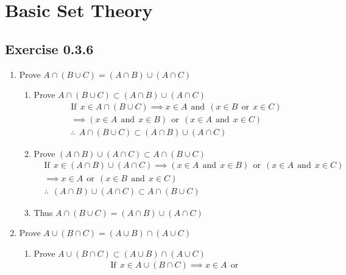 \chapter*{Basic Set Theory}
\section*{Exercise 0.3.6}
  \begin{enumerate}
    \item Prove $A \cap (B \cup C) = (A \cap B) \cup (A \cap C)$
    \begin{enumerate}
      \item Prove $A \cap (B \cup C) \subset (A \cap B) \cup (A \cap C)$
      \begin{align*}
        \nonumber
        &\text{If}\ \ x \in A \cap (B \cup C) \implies x \in A \ \ \text{and}\ \ 
        (x \in B \ \ \text{or} \ \ x \in C) \\
        \nonumber
        &\implies (x \in A \ \ \text{and} \ \ x \in B) \ \ \text{or} \ \ 
        (x \in A \ \ \text{and} \ \ x \in C) \\
        \nonumber
        &\therefore \ \ A \cap (B \cup C) \subset (A \cap B) \cup (A \cap C)
      \end{align*}
      \item Prove $(A \cap B) \cup (A \cap C) \subset A \cap (B \cup C)$
      \begin{align*}
        \nonumber
        &\text{If}\ \ x \in (A \cap B) \cup (A \cap C) \implies
        (x \in A \ \ \text{and} \ \ x \in B)\ \ \text{or} \ \ 
        (x \in A \ \ \text{and} \ \ x \in C) \\
        \nonumber
        &\implies x \in A \ \ \text{or} \ \ 
        (x \in B \ \ \text{and} \ \ x \in C) \\
        \nonumber
        &\therefore \ \ (A \cap B) \cup (A \cap C) \subset A \cap (B \cup C)
      \end{align*}
      \item Thus $A \cap (B \cup C) = (A \cap B) \cup (A \cap C)$ \qedsymbol{}
    \end{enumerate}
    \item Prove $A \cup (B \cap C) = (A \cup B) \cap (A \cup C)$
    \begin{enumerate}
      \item Prove $A \cup (B \cap C) \subset (A \cup B) \cap (A \cup C)$
      \begin{align*}
        &\text{If}\ \ x \in A \cup (B \cap C) \implies x \in A \ \ \text{or} \ \ 

\end{align*}
\end{enumerate}
\end{enumerate}
